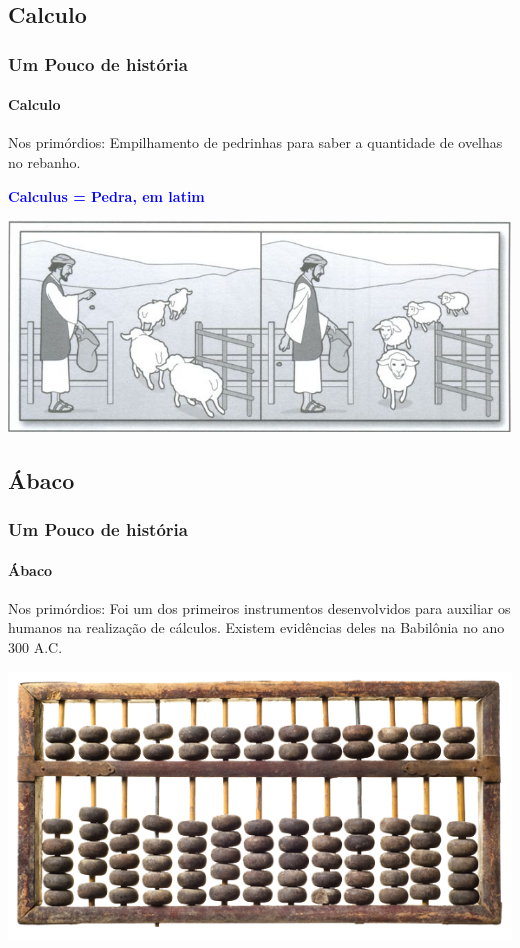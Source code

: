 \documentclass[12pt,a4paper,final]{beamer}
\begin{document}
        \subsection{Calculo}
            \begin{frame}
                \frametitle{Um Pouco de história}
                \framesubtitle{Calculo}
                \begin{block}{Nos primórdios:}
                    Empilhamento de pedrinhas para saber a quantidade de ovelhas no rebanho.
                \end{block}
                \begin{block}{}
                    \centering
                    \textcolor{blue}{\large \textbf{Calculus = Pedra, em latim}}
                \end{block}
                \begin{block}{}
                     \centering
                     \includegraphics[scale=0.4]{Imagens/ovelhas.png}
                \end{block}
            \end{frame}
        \subsection{Ábaco}
            \begin{frame}
                \frametitle{Um Pouco de história}
                \framesubtitle{Ábaco}
                \begin{block}{Nos primórdios:}
                   Foi um dos primeiros instrumentos desenvolvidos para auxiliar os humanos na realização de cálculos. Existem evidências deles na Babilônia no ano 300 A.C.
                \end{block}
                \begin{block}{}
                     \centering
                     \includegraphics[scale=1.2]{Imagens/abaco.png}
                \end{block}
            \end{frame}
\end{document}
